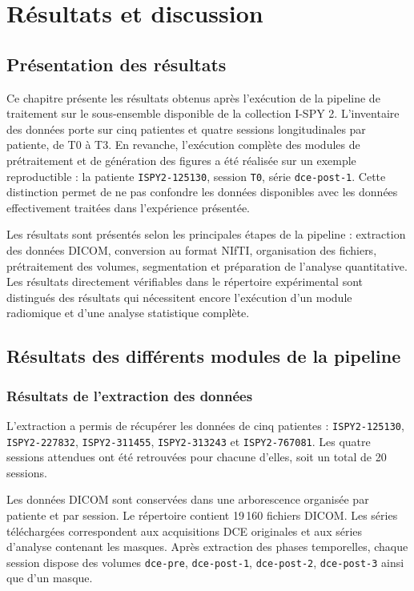 \chapter{Résultats et discussion}
\label{chap:resultats_discussion}

\section{Présentation des résultats}
\label{sec:presentation_resultats}

Ce chapitre présente les résultats obtenus après l'exécution de la pipeline de traitement sur le sous-ensemble disponible de la collection I-SPY 2. L'inventaire des données porte sur cinq patientes et quatre sessions longitudinales par patiente, de T0 à T3. En revanche, l'exécution complète des modules de prétraitement et de génération des figures a été réalisée sur un exemple reproductible : la patiente \texttt{ISPY2-125130}, session \texttt{T0}, série \texttt{dce-post-1}. Cette distinction permet de ne pas confondre les données disponibles avec les données effectivement traitées dans l'expérience présentée.

Les résultats sont présentés selon les principales étapes de la pipeline : extraction des données DICOM, conversion au format NIfTI, organisation des fichiers, prétraitement des volumes, segmentation et préparation de l'analyse quantitative. Les résultats directement vérifiables dans le répertoire expérimental sont distingués des résultats qui nécessitent encore l'exécution d'un module radiomique et d'une analyse statistique complète.

\section{Résultats des différents modules de la pipeline}
\label{sec:resultats_modules}

\subsection{Résultats de l'extraction des données}
\label{subsec:resultats_extraction}

L'extraction a permis de récupérer les données de cinq patientes : \texttt{ISPY2-125130}, \texttt{ISPY2-227832}, \texttt{ISPY2-311455}, \texttt{ISPY2-313243} et \texttt{ISPY2-767081}. Les quatre sessions attendues ont été retrouvées pour chacune d'elles, soit un total de 20 sessions.

Les données DICOM sont conservées dans une arborescence organisée par patiente et par session. Le répertoire contient 19\,160 fichiers DICOM. Les séries téléchargées correspondent aux acquisitions DCE originales et aux séries d'analyse contenant les masques. Après extraction des phases temporelles, chaque session dispose des volumes \texttt{dce-pre}, \texttt{dce-post-1}, \texttt{dce-post-2}, \texttt{dce-post-3} ainsi que d'un masque.

